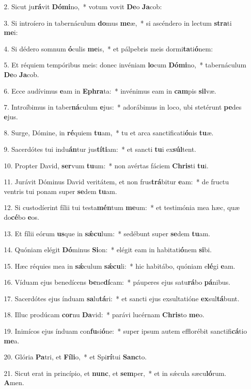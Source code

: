 2. Sicut ju\textbf{rá}vit \textbf{Dó}\textbf{mi}no,~*  votum vovit \textbf{De}o \textbf{Ja}cob:\

3. Si introíero in tabernáculum \textbf{do}mus \textbf{me}æ,~*  si ascéndero in lectum \textbf{stra}ti \textbf{me}i:\

4. Si dédero somnum \textbf{ó}culis \textbf{me}is,~*  et pálpebris meis dormi\textbf{ta}ti\textbf{ó}nem:\

5. Et réquiem tempóribus meis: donec invéniam \textbf{lo}cum \textbf{Dó}\textbf{mi}no,~*  tabernáculum \textbf{De}o \textbf{Ja}cob.\

6. Ecce audívimus \textbf{e}am in \textbf{E}\textbf{phra}ta:~*  invénimus eam in \textbf{cam}pis \textbf{sil}væ.\

7. Introíbimus in taber\textbf{ná}culum \textbf{e}jus:~*  adorábimus in loco, ubi stetérunt \textbf{pe}des \textbf{e}jus.\

8. Surge, Dómine, in \textbf{ré}quiem \textbf{tu}am,~*  tu et arca sanctificati\textbf{ó}nis \textbf{tu}æ.\

9. Sacerdótes tui indu\textbf{án}tur jus\textbf{tí}\textbf{ti}am:~*  et sancti \textbf{tu}i ex\textbf{súl}tent.\

10. Propter David, \textbf{ser}vum \textbf{tu}um:~*  non avértas fáciem \textbf{Chris}ti \textbf{tu}i.\

11. Jurávit Dóminus David veritátem, et non frus\textbf{trá}bitur \textbf{e}am:~*  de fructu ventris tui ponam super \textbf{se}dem \textbf{tu}am.\

12. Si custodíerint fílii tui testa\textbf{mén}tum \textbf{me}um:~*  et testimónia mea hæc, quæ do\textbf{cé}bo \textbf{e}os.\

13. Et fílii eórum \textbf{us}que in \textbf{sǽ}\textbf{cu}lum:~*  sedébunt super \textbf{se}dem \textbf{tu}am.\

14. Quóniam elégit \textbf{Dó}minus \textbf{Si}on:~*  elégit eam in habitati\textbf{ó}nem \textbf{si}bi.\

15. Hæc réquies mea in \textbf{sǽ}culum \textbf{sǽ}\textbf{cu}li:~*  hic habitábo, quóniam e\textbf{lé}gi \textbf{e}am.\

16. Víduam ejus benedícens \textbf{be}ne\textbf{dí}cam:~*  páuperes ejus satu\textbf{rá}bo \textbf{pá}nibus.\

17. Sacerdótes ejus índuam \textbf{sa}lu\textbf{tá}ri:~*  et sancti ejus exsultatióne \textbf{ex}sul\textbf{tá}bunt.\

18. Illuc prodúcam \textbf{cor}nu \textbf{Da}vid:~*  parávi lucérnam \textbf{Chris}to \textbf{me}o.\

19. Inimícos ejus índuam con\textbf{fu}si\textbf{ó}ne:~*  super ipsum autem efflorébit sanctifi\textbf{cá}tio \textbf{me}a.\

20. Glória \textbf{Pa}tri, et \textbf{Fí}\textbf{li}o,~*  et Spi\textbf{rí}tui \textbf{Sanc}to.\

21. Sicut erat in princípio, et \textbf{nunc}, et \textbf{sem}per,~*  et in sǽcula sæcu\textbf{ló}rum. \textbf{A}men.\

